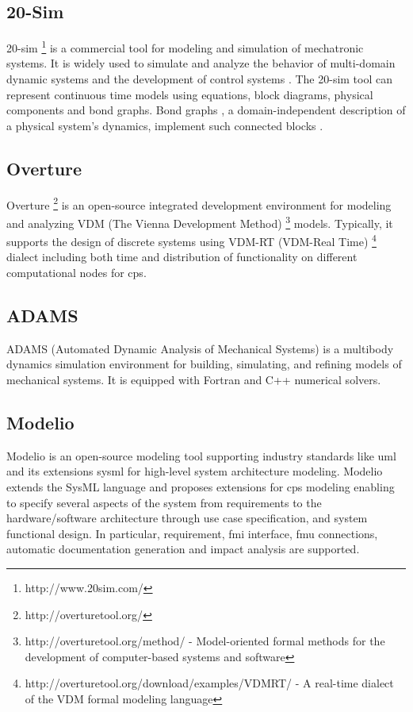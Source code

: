 \subsection{20-Sim}
\label{susec:20sim}


20-sim \footnote{http://www.20sim.com/} is a commercial tool for modeling and simulation of mechatronic systems. It  is widely used to simulate and analyze the behavior of multi-domain dynamic systems and the development of control systems \cite{20sim,20simduindam,20simjan}. The 20-sim tool can represent continuous time models using equations, block diagrams, physical components and bond graphs. Bond graphs \cite{20simgawthrop}, a domain-independent description of a physical system's dynamics, implement such connected blocks . 


\subsection{Overture}
\label{sec:overture}

Overture \footnote{http://overturetool.org/} is an open-source integrated development environment for modeling and analyzing VDM (The Vienna Development Method) \footnote{http://overturetool.org/method/ - Model-oriented formal methods for the development of computer-based systems and software} models. Typically, it supports \cite{overtureverhoef} the design of discrete systems using VDM-RT (VDM-Real Time) \footnote{http://overturetool.org/download/examples/VDMRT/ - A real-time dialect of the VDM formal modeling language} dialect including both time and distribution of functionality on different computational nodes for \acrshort{cps}.


\subsection{ADAMS}
\label{sec:adams}

ADAMS (Automated Dynamic Analysis of Mechanical Systems) \cite{adams} is a multibody dynamics simulation environment for building, simulating, and refining models of mechanical systems. It is equipped with Fortran and C++ numerical solvers. 

\subsection{Modelio}
\label{sec:modelio}

Modelio \cite{modelio} is an open-source modeling tool supporting industry standards like \acrshort{uml} and its extensions \acrshort{sysml} for high-level system architecture modeling. Modelio extends the SysML language \cite{sysml, sysmlmorgan} and proposes extensions for \acrshort{cps} modeling enabling to specify several aspects of the system from requirements to the hardware/software architecture through use case specification, and system functional design. In particular, requirement, \acrshort{fmi} interface, \acrshort{fmu} connections, automatic documentation generation and impact analysis are supported. 


